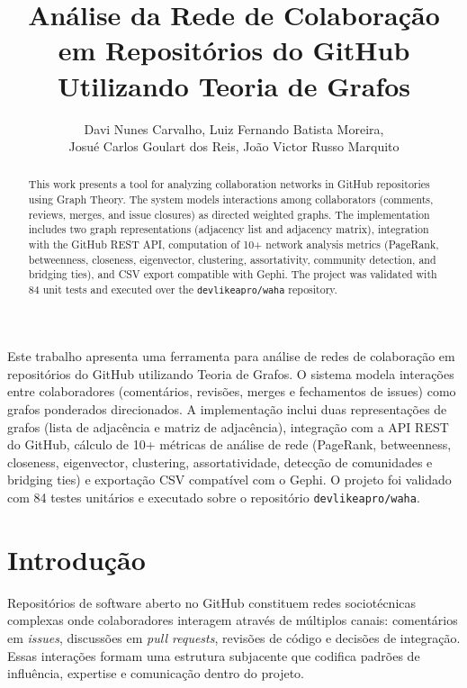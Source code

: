 \documentclass[12pt]{article}
\title{Análise da Rede de Colaboração em Repositórios do GitHub Utilizando Teoria de Grafos}
\author{Davi Nunes Carvalho\inst{1}, Luiz Fernando Batista Moreira\inst{1},\\
  Josué Carlos Goulart dos Reis\inst{1}, João Victor Russo Marquito\inst{1}}
\begin{document}
\maketitle

\begin{abstract}
  This work presents a tool for analyzing collaboration networks in GitHub
  repositories using Graph Theory. The system models interactions among
  collaborators (comments, reviews, merges, and issue closures) as directed
  weighted graphs. The implementation includes two graph representations
  (adjacency list and adjacency matrix), integration with the GitHub REST API,
  computation of 10+ network analysis metrics (PageRank, betweenness, closeness,
  eigenvector, clustering, assortativity, community detection, and bridging ties),
  and CSV export compatible with Gephi. The project was validated with 84 unit
  tests and executed over the \texttt{devlikeapro/waha} repository.
\end{abstract}

\begin{resumo}
  Este trabalho apresenta uma ferramenta para análise de redes de colaboração em
  repositórios do GitHub utilizando Teoria de Grafos. O sistema modela interações
  entre colaboradores (comentários, revisões, merges e fechamentos de issues)
  como grafos ponderados direcionados. A implementação inclui duas representações
  de grafos (lista de adjacência e matriz de adjacência), integração com a API
  REST do GitHub, cálculo de 10+ métricas de análise de rede (PageRank,
  betweenness, closeness, eigenvector, clustering, assortatividade, detecção de
  comunidades e bridging ties) e exportação CSV compatível com o Gephi. O projeto
  foi validado com 84 testes unitários e executado sobre o repositório
  \texttt{devlikeapro/waha}.
\end{resumo}

\section{Introdução}\label{sec:intro}

Repositórios de software aberto no GitHub constituem redes sociotécnicas complexas onde colaboradores interagem através de múltiplos canais: comentários em \textit{issues}, discussões em \textit{pull requests}, revisões de código e decisões de integração. Essas interações formam uma estrutura subjacente que codifica padrões de influência, expertise e comunicação dentro do projeto.
\end{document}
